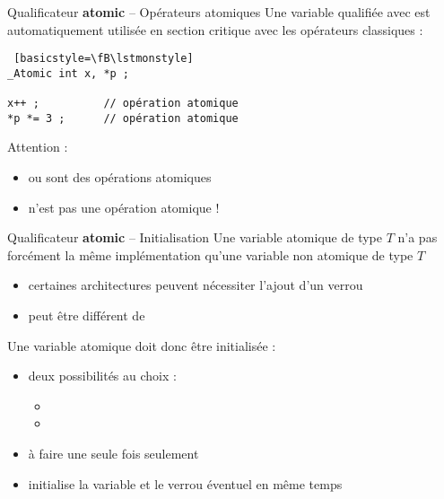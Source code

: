 \begin {frame} [fragile] {Qualificateur \textbf {atomic} -- Opérateurs atomiques}
    Une variable qualifiée avec  est automatiquement
    utilisée en section critique avec les opérateurs classiques :

    \begin {lstlisting} [basicstyle=\fB\lstmonstyle]
_Atomic int x, *p ;

x++ ;          // opération atomique
*p *= 3 ;      // opération atomique
\end{lstlisting}

    \vspace* {3mm}

    Attention :
    \begin {itemize}
	\item {}  ou  sont des opérations atomiques
	\item {} n'est pas une opération atomique !
    \end {itemize}

\end{frame}

\begin {frame} {Qualificateur \textbf {atomic} -- Initialisation}
    Une variable atomique de type $T$ n'a pas forcément la même
    implémentation qu'une variable non atomique de type $T$

    \begin {itemize} 
	\item certaines architectures peuvent nécessiter l'ajout
	    d'un verrou

	\item {} peut être différent de

    \end {itemize} 

    Une variable atomique doit donc être initialisée :

    \begin {itemize}
	\item deux possibilités au choix :
	    \begin {itemize}
		\item {}
		\item {}
	    \end {itemize}
	\item à faire une seule fois seulement
	\item initialise la variable et le verrou éventuel en même temps
    \end {itemize}
\end {frame}

